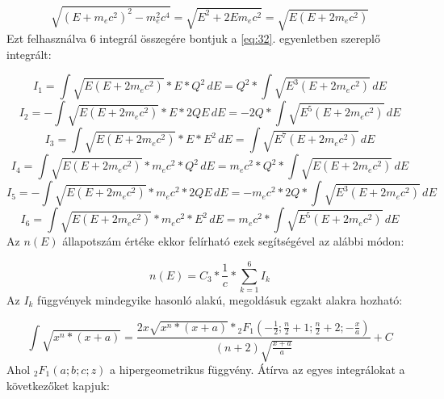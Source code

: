 \begin{equation} \label{eq:33}
\sqrt{\left( E + m_{e} c^{2} \right)^{2} - m_{e}^{2} c^{4}}
=
\sqrt{E^{2} + 2Em_{e}c^{2}}
=
\sqrt{E \left( E + 2m_{e}c^{2} \right)}
\end{equation}
Ezt felhasználva 6 integrál összegére bontjuk a \ref{eq:32}. egyenletben szereplő integrált:

\begin{equation} \label{eq:34}
I_{1}
=
\int \sqrt{E \left( E + 2m_{e}c^{2} \right)} * E * Q^{2}\,dE
=
Q^{2} * \int \sqrt{E^{3} \left( E + 2m_{e}c^{2} \right)}\,dE
\end{equation}
\begin{equation} \label{eq:35}
I_{2}
=
- \int \sqrt{E \left( E + 2m_{e}c^{2} \right)} * E * 2QE\,dE
=
- 2Q * \int \sqrt{E^{5} \left( E + 2m_{e}c^{2} \right)}\,dE
\end{equation}
\begin{equation} \label{eq:36}
I_{3}
=
\int \sqrt{E \left( E + 2m_{e}c^{2} \right)} * E * E^{2}\,dE
=
\int \sqrt{E^{7} \left( E + 2m_{e}c^{2} \right)}\,dE
\end{equation}
\begin{equation} \label{eq:37}
I_{4}
=
\int \sqrt{E \left( E + 2m_{e}c^{2} \right)} * m_{e} c^{2} * Q^{2}\,dE
=
m_{e} c^{2} * Q^{2} * \int \sqrt{E \left( E + 2m_{e}c^{2} \right)}\,dE
\end{equation}
\begin{equation} \label{eq:38}
I_{5}
=
- \int \sqrt{E \left( E + 2m_{e}c^{2} \right)} * m_{e} c^{2} * 2QE\,dE
=
- m_{e} c^{2} * 2Q * \int \sqrt{E^{3} \left( E + 2m_{e}c^{2} \right)}\,dE
\end{equation}
\begin{equation} \label{eq:39}
I_{6}
=
\int \sqrt{E \left( E + 2m_{e}c^{2} \right)} * m_{e} c^{2} * E^{2}\,dE
=
m_{e} c^{2} * \int \sqrt{E^{5} \left( E + 2m_{e}c^{2} \right)}\,dE
\end{equation}
Az $n \left( E \right)$ állapotszám értéke ekkor felírható ezek segítségével az alábbi módon:

\begin{equation} \label{eq:40}
n \left( E \right)
=
C_{3} * \frac{1}{c} * \sum_{k = 1}^{6} I_{k}
\end{equation}
Az $I_{k}$ függvények mindegyike hasonló alakú, megoldásuk egzakt alakra hozható:

\begin{equation} \label{eq:41}
\int \sqrt{x^{n} * \left( x + a \right)}
=
\frac{2x \sqrt{x^{n} * \left( x + a \right)} * {}_{2}F_{1} \left( -\frac{1}{2}; \frac{n}{2} + 1; \frac{n}{2} + 2; -\frac{x}{a} \right)}{\left( n + 2 \right) \sqrt{\frac{x + a}{a}}} + C
\end{equation}
Ahol ${}_{2}F_{1} \left( a; b; c; z \right)$ a hipergeometrikus függvény. Átírva az egyes integrálokat a következőket kapjuk:

